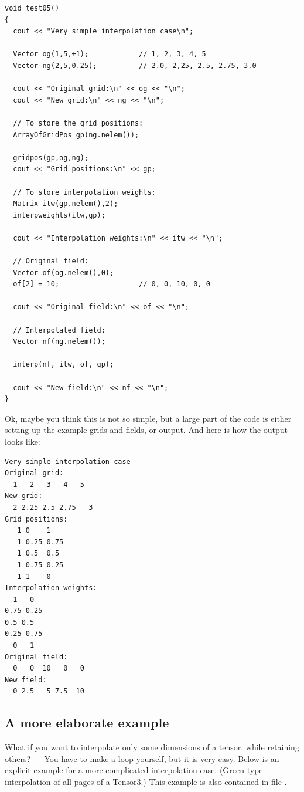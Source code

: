 {\small
\begin{verbatim}
void test05()
{
  cout << "Very simple interpolation case\n";

  Vector og(1,5,+1);            // 1, 2, 3, 4, 5
  Vector ng(2,5,0.25);          // 2.0, 2,25, 2.5, 2.75, 3.0

  cout << "Original grid:\n" << og << "\n";
  cout << "New grid:\n" << ng << "\n";

  // To store the grid positions:
  ArrayOfGridPos gp(ng.nelem());

  gridpos(gp,og,ng);
  cout << "Grid positions:\n" << gp;

  // To store interpolation weights:
  Matrix itw(gp.nelem(),2);
  interpweights(itw,gp);
    
  cout << "Interpolation weights:\n" << itw << "\n";

  // Original field:
  Vector of(og.nelem(),0);
  of[2] = 10;                   // 0, 0, 10, 0, 0

  cout << "Original field:\n" << of << "\n";

  // Interpolated field:
  Vector nf(ng.nelem());

  interp(nf, itw, of, gp);

  cout << "New field:\n" << nf << "\n";
}
\end{verbatim}
}

\hspace{-\parindent}Ok, maybe you think this is not so simple, but a
large part of the code is either setting up the example grids and
fields, or output. And here is how the output looks like:

{\small
\begin{verbatim}
Very simple interpolation case
Original grid:
  1   2   3   4   5
New grid:
  2 2.25 2.5 2.75   3
Grid positions:
   1 0    1
   1 0.25 0.75
   1 0.5  0.5
   1 0.75 0.25
   1 1    0
Interpolation weights:
  1   0
0.75 0.25
0.5 0.5
0.25 0.75
  0   1
Original field:
  0   0  10   0   0
New field:
  0 2.5   5 7.5  10
\end{verbatim}
}

\subsection{A more elaborate example}

What if you want to interpolate only some dimensions of a tensor,
while retaining others? --- You have to make a loop yourself, but it
is very easy. Below is an explicit example for a more complicated
interpolation case. (Green type interpolation of all pages of a
Tensor3.) This example is also contained in file
.

